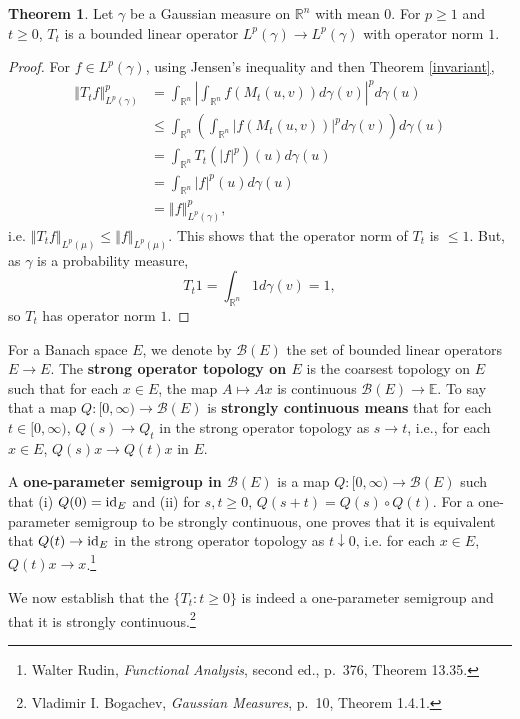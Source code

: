 \documentclass{article}
\newcommand{\id}{\ensuremath\mathrm{id}}
\newcommand{\norm}[1]{\left\Vert #1 \right\Vert}
\theoremstyle{definition}
\newtheorem{theorem}{Theorem}
\theoremstyle{definition}
\begin{document}
\begin{theorem}
Let $\gamma$ be a Gaussian measure on
$\mathbb{R}^n$ with mean $0$.
For $p \geq 1$ and $t \geq 0$, $T_t$ is a bounded linear operator
$L^p(\gamma) \to L^p(\gamma)$ with operator norm $1$.
\label{bounded}
\end{theorem}
\begin{proof}
For $f \in L^p(\gamma)$,
using
Jensen's  inequality and then Theorem \ref{invariant},
\begin{align*}
\norm{T_t f}_{L^p(\gamma)}^p& =
\int_{\mathbb{R}^n} \left| \int_{\mathbb{R}^n} f(M_t(u,v))
d\gamma(v) \right|^p d\gamma(u) \\
&\leq \int_{\mathbb{R}^n} \left( \int_{\mathbb{R}^n} | f(M_t(u,v))|^p d\gamma(v) \right) d\gamma(u)\\
&=\int_{\mathbb{R}^n} T_t(|f|^p)(u) d\gamma(u)\\
&=\int_{\mathbb{R}^n} |f|^p(u) d\gamma(u)\\
&=\norm{f}_{L^p(\gamma)}^p,
\end{align*}
i.e. $\norm{T_t f}_{L^p(\mu)} \leq \norm{f}_{L^p(\mu)}$.
This shows that the operator norm of $T_t$ is $\leq 1$. But, as $\gamma$ is a probability measure,
\[
T_t 1 = \int_{\mathbb{R}^n} 1 d\gamma(v)
=1,
\]
so $T_t$ has operator norm $1$. 
\end{proof}



For a Banach space $E$, we denote by $\mathscr{B}(E)$ the set of bounded linear operators
$E \to E$. The \textbf{strong operator topology on $E$} is the coarsest topology on $E$ such that
for each $x \in E$, the map $A \mapsto Ax$ is continuous $\mathscr{B}(E) \to \mathbb{E}$. 
To say that a map $Q:[0,\infty) \to \mathscr{B}(E)$ is \textbf{strongly continuous means} that
for each $t \in [0,\infty)$,
$Q(s) \to Q_t$ in the strong operator topology as $s \to t$, i.e., for each $x \in E$,
$Q(s) x \to Q(t) x$ in $E$. 

A \textbf{one-parameter semigroup in $\mathscr{B}(E)$} is a map
$Q:[0,\infty) \to \mathscr{B}(E)$ such that (i) $Q(0)=\id_E$ and (ii) for $s,t \geq 0$,
$Q(s+t)=Q(s) \circ Q(t)$. For a one-parameter semigroup to be strongly continuous,
one proves that it is equivalent that 
$Q(t) \to \id_E$ in the strong operator topology as $t \downarrow 0$, i.e. 
for each $x \in E$, $Q(t)x \to x$.\footnote{Walter Rudin, {\em Functional Analysis},
second ed., p.~376, Theorem 13.35.}

We now establish that the $\{T_t:t \geq 0\}$ is indeed a one-parameter semigroup and that it is strongly continuous.\footnote{Vladimir I. Bogachev,
{\em Gaussian Measures}, p.~10, Theorem 1.4.1.}
\end{document}
